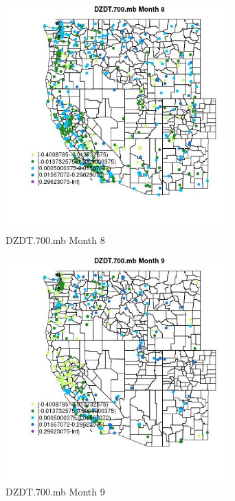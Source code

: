 \begin{figure} 
\centering  
\includegraphics[width=0.77\textwidth]{Code_Outputs/Report_ML_input_PM25_Step4_part_e_de_duplicated_aves_compiled_2019-05-18wNAs_MapObsMo8DZDT700mb.jpg} 
\caption{\label{fig:Report_ML_input_PM25_Step4_part_e_de_duplicated_aves_compiled_2019-05-18wNAsMapObsMo8DZDT700mb}DZDT.700.mb Month 8} 
\end{figure} 
 

\begin{figure} 
\centering  
\includegraphics[width=0.77\textwidth]{Code_Outputs/Report_ML_input_PM25_Step4_part_e_de_duplicated_aves_compiled_2019-05-18wNAs_MapObsMo9DZDT700mb.jpg} 
\caption{\label{fig:Report_ML_input_PM25_Step4_part_e_de_duplicated_aves_compiled_2019-05-18wNAsMapObsMo9DZDT700mb}DZDT.700.mb Month 9} 
\end{figure} 
 

